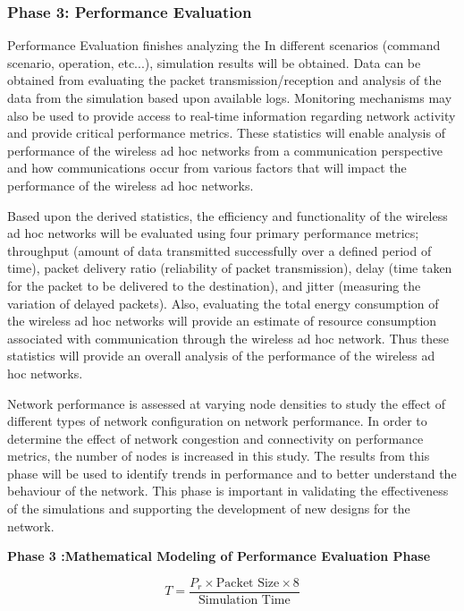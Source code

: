 \documentclass[a4paper,fleqn]{cas-dc}
\numberwithin{equation}{section}
\begin{document}
\subsubsection{Phase 3: Performance Evaluation }

Performance Evaluation finishes analyzing the In different scenarios (command scenario, operation, etc...), simulation results will be obtained. Data can be obtained from evaluating the packet transmission/reception and analysis of the data from the simulation based upon available logs. Monitoring mechanisms may also be used to provide access to real-time information regarding network activity and provide critical performance metrics. These statistics will enable analysis of performance of the wireless ad hoc networks from a communication perspective and how communications occur from various factors that will impact the performance of the wireless ad hoc networks.

Based upon the derived statistics, the efficiency and functionality of the wireless ad hoc networks will be evaluated using four primary performance metrics; throughput (amount of data transmitted successfully over a defined period of time), packet delivery ratio (reliability of packet transmission), delay (time taken for the packet to be delivered to the destination), and jitter (measuring the variation of delayed packets). Also, evaluating the total energy consumption of the wireless ad hoc networks will provide an estimate of resource consumption associated with communication through the wireless ad hoc network. Thus these statistics will provide an overall analysis of the performance of the wireless ad hoc networks.

Network performance is assessed at varying node densities to study the effect of different types of network configuration on network performance. In order to determine the effect of network congestion and connectivity on performance metrics, the number of nodes is increased in this study. The results from this phase will be used to identify trends in performance and to better understand the behaviour of the network. This phase is important in validating the effectiveness of the simulations and supporting the development of new designs for the network.

\textbf{Phase 3 :Mathematical Modeling of Performance Evaluation Phase}

\begin{equation}
T = \frac{P_r \times \text{Packet Size} \times 8}{\text{Simulation Time}}
\label{eq:p3_1}
\end{equation}
\end{document}

